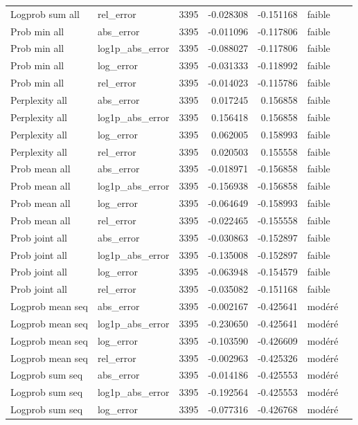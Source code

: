 \begin{longtable}{p{4.0cm}p{2.5cm}rrrll}
Logprob sum all & rel\_error & 3395 & -0.028308 & -0.151168 & faible \\
Prob min all & abs\_error & 3395 & -0.011096 & -0.117806 & faible \\
Prob min all & log1p\_abs\_error & 3395 & -0.088027 & -0.117806 & faible \\
Prob min all & log\_error & 3395 & -0.031333 & -0.118992 & faible \\
Prob min all & rel\_error & 3395 & -0.014023 & -0.115786 & faible \\
Perplexity all & abs\_error & 3395 & 0.017245 & 0.156858 & faible \\
Perplexity all & log1p\_abs\_error & 3395 & 0.156418 & 0.156858 & faible \\
Perplexity all & log\_error & 3395 & 0.062005 & 0.158993 & faible \\
Perplexity all & rel\_error & 3395 & 0.020503 & 0.155558 & faible \\
Prob mean all & abs\_error & 3395 & -0.018971 & -0.156858 & faible \\
Prob mean all & log1p\_abs\_error & 3395 & -0.156938 & -0.156858 & faible \\
Prob mean all & log\_error & 3395 & -0.064649 & -0.158993 & faible \\
Prob mean all & rel\_error & 3395 & -0.022465 & -0.155558 & faible \\
Prob joint all & abs\_error & 3395 & -0.030863 & -0.152897 & faible \\
Prob joint all & log1p\_abs\_error & 3395 & -0.135008 & -0.152897 & faible \\
Prob joint all & log\_error & 3395 & -0.063948 & -0.154579 & faible \\
Prob joint all & rel\_error & 3395 & -0.035082 & -0.151168 & faible \\
Logprob mean seq & abs\_error & 3395 & -0.002167 & -0.425641 & modéré \\
Logprob mean seq & log1p\_abs\_error & 3395 & -0.230650 & -0.425641 & modéré \\
Logprob mean seq & log\_error & 3395 & -0.103590 & -0.426609 & modéré \\
Logprob mean seq & rel\_error & 3395 & -0.002963 & -0.425326 & modéré \\
Logprob sum seq & abs\_error & 3395 & -0.014186 & -0.425553 & modéré \\
Logprob sum seq & log1p\_abs\_error & 3395 & -0.192564 & -0.425553 & modéré \\
Logprob sum seq & log\_error & 3395 & -0.077316 & -0.426768 & modéré \\

\end{longtable}
